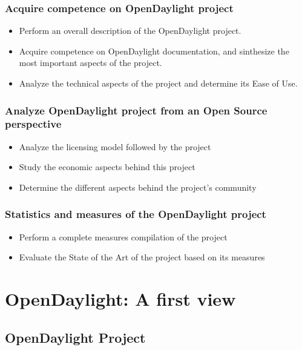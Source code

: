 \documentclass[a4paper, 12pt]{book}
\begin{document}
\subsection{Acquire competence on OpenDaylight project}
\begin{itemize}
 \item Perform an overall description of the OpenDaylight project.
 \item Acquire competence on OpenDaylight documentation, and sinthesize the most important aspects of the project.
 \item Analyze the technical aspects of the project and determine its Ease of Use.
\end{itemize}

\subsection{Analyze OpenDaylight project from an Open Source perspective}
\begin{itemize}
 \item Analyze the licensing model followed by the project
 \item Study the economic aspects behind this project
 \item Determine the different aspects behind the project's community
\end{itemize}

\subsection{Statistics and measures of the OpenDaylight project}
\begin{itemize}
 \item Perform a complete measures compilation of the project
 \item Evaluate the State of the Art of the project based on its measures
\end{itemize}

\chapter{OpenDaylight: A first view}
\label{chap:odlfirstview}

\section{OpenDaylight Project}
\label{sec:odlintro}
\end{document}
